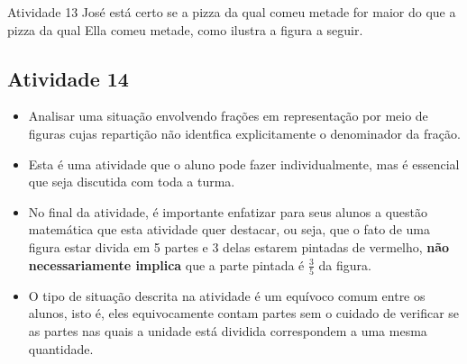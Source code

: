 \documentclass[oneside]{book}
\begin{document}
\begin{multicols}{2}
\begin{resposta*}{Atividade 13}
  José está certo se a pizza da qual comeu metade for maior do que a pizza da qual Ella comeu metade, como ilustra a figura a seguir.
  \begin{center}

  \end{center}

  \end{resposta*}



\subsection{Atividade 14}




  \vspace{.1cm}

  \begin{itemize} %
    \item       Analisar uma situação envolvendo frações em representação por meio de figuras cujas repartição não identfica explicitamente o denominador da fração.
\end{itemize} %


  \vspace{.1cm} 
  
  \vspace{.1cm}
  
\begin{itemize} %
    \item       Esta é uma atividade que o aluno pode fazer individualmente, mas é essencial que seja discutida com toda a turma.
    \item       No final da atividade, é importante enfatizar para seus alunos a questão matemática que esta atividade quer destacar, ou seja, que o fato de uma figura estar divida em 5 partes e 3 delas estarem pintadas de vermelho,       {\bf não necessariamente implica}       que a parte pintada é       $\frac{3}{5}$       da figura.
    \item       O tipo de situação descrita na atividade é um equívoco comum entre os alunos, isto é, eles equivocamente contam partes sem o cuidado de verificar se as partes nas quais a unidade está dividida correspondem a uma mesma quantidade.
\end{itemize} %



\end{multicols}
\end{document}
